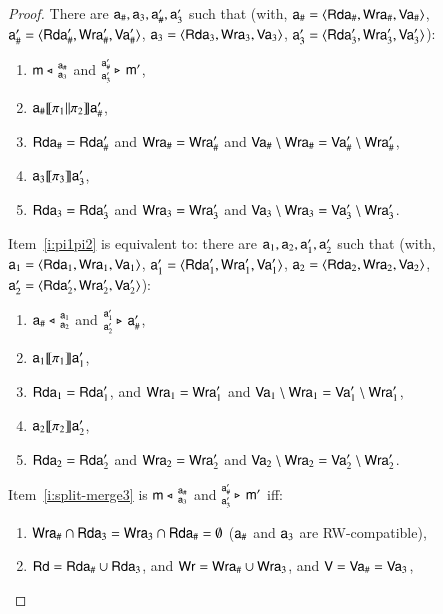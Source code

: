 \begin{proof}
There are $\modla_\#, \modla_3, \modla_\#', \modla_3'$ such that
(with, $\modla_\# = \tuple{\readseta_\#, \writeseta_\#, \valuseta_\#}$, $\modla'_\# = \tuple{\readseta'_\#, \writeseta'_\#, \valuseta'_\#}$, $\modla_3 = \tuple{\readseta_3, \writeseta_3, \valuseta_3}$, $\modla'_3 = \tuple{\readseta'_3, \writeseta'_3, \valuseta'_3}$):
\begin{enumerate}[resume]
\item\label{i:split-merge3}\label{i:rhsfirst} $\splt{\modl}{\modla_\#} {\modla_3}$
  and $\mrg{\modl'}{\modla'_\#} {\modla'_3}$, 
\item\label{i:pi1pi2} $\modla_\# \intPgm{ \pi_1 \pll \pi_2} \modla'_\#$,
\item $\readseta_\# = \readseta'_\#$
  and $\writeseta_\# = \writeseta'_\#$
  and $\valuseta_\# \setminus \writeseta_\# = \valuseta'_\# \setminus \writeseta'_\#$,
\item $\modla_3 \intPgm{ \pi_3 } \modla'_3$, 
\item $\readseta_3 = \readseta'_3$
  and $\writeseta_3 = \writeseta'_3$ 
  and $\valuseta_3 \setminus \writeseta_3 = \valuseta'_3 \setminus \writeseta'_3$.
\end{enumerate}
Item~\ref{i:pi1pi2} is equivalent to:
there are $\modla_1, \modla_2, \modla'_1, \modla'_2$ such that 
(with, $\modla_1 = \tuple{\readseta_1, \writeseta_1, \valuseta_1}$, $\modla'_1 = \tuple{\readseta'_1, \writeseta'_1, \valuseta'_1}$, $\modla_2 = \tuple{\readseta_2, \writeseta_2, \valuseta_2}$, $\modla'_2 = \tuple{\readseta'_2, \writeseta'_2, \valuseta'_2}$):
\begin{enumerate}[resume]
\item\label{i:split-merge4} $\splt{\modla_\#}{\modla_1} {\modla_2}$
  and $\mrg{\modla'_\#}{\modla'_1} {\modla'_2}$, 
\item $\modla_1 \intPgm{ \pi_1} \modla'_1$,
\item $\readseta_1 = \readseta'_1$,
  and $\writeseta_1 = \writeseta'_1$
  and $\valuseta_1 \setminus \writeseta_1 = \valuseta'_1 \setminus \writeseta'_1$,
\item $\modla_2 \intPgm{ \pi_2 } \modla'_2$, 
\item $\readseta_2 = \readseta'_2$
  and $\writeseta_2 = \writeseta'_2$ 
  and $\valuseta_2 \setminus \writeseta_2 = \valuseta'_2 \setminus \writeseta'_2$.
\end{enumerate}
Item~\ref{i:split-merge3} is $\splt{\modl}{\modla_\#} {\modla_3}$ and $\mrg{\modl'}{\modla'_\#} {\modla'_3}$ iff:
\begin{enumerate}[resume]
\item
  $\writeseta_\# \cap \readseta_3 = \writeseta_3 \cap \readseta_\# = \emptyset$ ($\modla_\#$ and $\modla_3$ are RW-compatible),
  \item 
    $\readset = \readseta_\# \cup \readseta_3 $, and $\writeset = \writeseta_\# \cup \writeseta_3$, and $\valuset = \valuseta_\# = \valuseta_3$,


\end{enumerate}
\end{proof}
